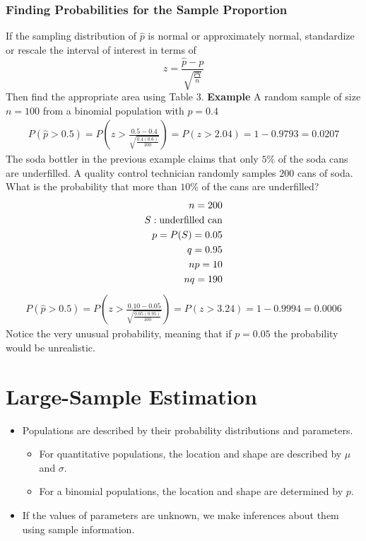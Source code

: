 \documentclass[12pt, letterpaper]{article}
\begin{document}
            \subsubsection{Finding Probabilities for the Sample Proportion}
                If the sampling distribution of $\hat{p}$ is normal or approximately normal, standardize or rescale the interval of interest in terms of $$z = \frac{\hat{p} - p}{\sqrt{\frac{pq}{n}}}$$
                Then find the appropriate area using Table 3.
                \textbf{Example}
                    A random sample of size $n = 100$ from a binomial population with $p = 0.4$
                    \begin{align*}
                        P(\hat{p} > 0.5) = P\left(z > \frac{0.5 - 0.4}{\sqrt{\frac{0.4(0.6)}{100}}}\right) = P(z > 2.04) = 1 - 0.9793 = 0.0207
                    \end{align*}
                    The soda bottler in the previous example claims that only $5\%$ of the soda cans are underfilled. A quality control technician randomly samples $200$ cans of soda. What is the probability that more than $10\%$ of the cans are underfilled? 
                    \begin{align*}
                        n = 200
                        \\ S: \textnormal{underfilled can}
                        \\ p = P(S) = 0.05
                        \\ q = 0.95
                        \\ np = 10 
                        \\ nq = 190 
                    \end{align*}
                    \begin{align*}
                        P(\hat{p} > 0.5) = P\left(z > \frac{0.10 - 0.05}{\sqrt{\frac{0.05(0.95)}{100}}}\right) = P(z > 3.24) = 1 - 0.9994 = 0.0006
                    \end{align*}
                    Notice the very unusual probability, meaning that if $p = 0.05$ the probability would be unrealistic.
    \section{Large-Sample Estimation}
        \begin{itemize}
            \item Populations are described by their probability distributions and parameters.
            \begin{itemize}
                \item For quantitative populations, the location and shape are described by $\mu$ and $\sigma$.
                \item For a binomial populations, the location and shape are determined by $p$.
            \end{itemize}
            \item If the values of parameters are unknown, we make inferences about them using sample information.
        \end{itemize}
\end{document}
